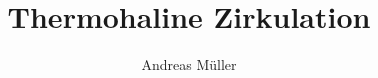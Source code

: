 %
%
%
\usepackage[utf8]{inputenc}
\usepackage[T1]{fontenc}
\usepackage{epic}
\usepackage{color}
\usepackage{array}
\usepackage{ifthen}
\usepackage{tikz}
\usepackage{lmodern}
\usetikzlibrary{shapes.geometric}
\beamertemplatenavigationsymbolsempty
\title[THC]{Thermohaline Zirkulation}
\author{Andreas Müller}
\date[]{}

